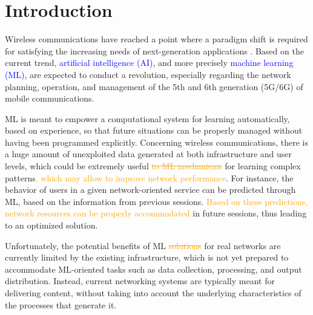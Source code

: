 \documentclass[journal]{IEEEtran}
\begin{document}
\section{Introduction}
% 
% 
% 
% 
Wireless communications have reached a point where a paradigm shift is required for satisfying the increasing needs of next-generation applications \cite{osseiran2014scenarios}. Based on the current trend, \textcolor{blue}{artificial intelligence (AI)}, and more precisely \textcolor{blue}{machine learning (ML)}, are expected to conduct a revolution, especially regarding the network planning, operation, and management of the 5th and 6th generation (5G/6G) of mobile communications. 

ML is meant to empower a computational system for learning automatically, based on experience, so that future situations can be properly managed without having been programmed explicitly. Concerning wireless communications, there is a huge amount of unexploited data generated at both infrastructure and user levels, which could be extremely useful \textcolor{orange}{\st{to ML mechanisms}} for learning complex patterns\textcolor{orange}{, which may allow to improve network performance}. For instance, the behavior of users in a given network-oriented service can be predicted through ML, based on the information from previous sessions. \textcolor{orange}{Based on these predictions, network resources can be properly accommodated} in future sessions, thus leading to an optimized solution.

Unfortunately, the potential benefits of ML \textcolor{orange}{\st{solutions}} for real networks are currently limited by the existing infrastructure, which is not yet prepared to accommodate ML-oriented tasks such as data collection, processing, and output distribution. Instead, current networking systems are typically meant for delivering content, without taking into account the underlying characteristics of the processes that generate it. 
\end{document}

